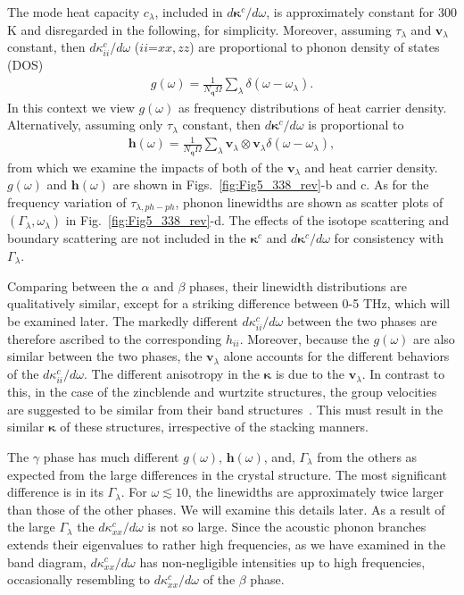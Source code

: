 \documentclass[twocolumn,amsmath,amssymb,a4paper,prb,superscriptaddress,floatfix]{revtex4-1}
\begin{document}
The mode heat capacity $c_\lambda$, included in
$d\boldsymbol{\kappa}^c/d\omega$, is approximately constant for 300 K and
disregarded in the following, for simplicity. Moreover, assuming $\tau_\lambda$
and $\mathbf{v}_\lambda$ constant, then $d\kappa_{ii}^c/d\omega$ ($ii$=$xx,zz$)
are proportional
to phonon density of states (DOS)  
\begin{align}
 \label{eq:dos}
 g(\omega) = \frac{1}{N_\mathbf{q}\Omega}
 \sum_\lambda
 \delta(\omega-\omega_{\lambda}).
\end{align}
In this context we view $g(\omega)$ as frequency distributions of heat
carrier density.  Alternatively, assuming only $\tau_\lambda$ constant,
then $d\boldsymbol{\kappa}^c/d\omega$ is proportional to
\begin{align}
 \label{eq:wdos}
 \boldsymbol{h}(\omega) = \frac{1}{N_\mathbf{q}\Omega}
 \sum_\lambda
 \mathbf{v}_\lambda \otimes \mathbf{v}_\lambda
 \delta(\omega-\omega_{\lambda}),
\end{align}
from which we examine the impacts of both of the $\mathbf{v}_\lambda$ and heat carrier
density.  $g(\omega)$ and  $\boldsymbol{h}(\omega)$
are shown in
Figs.~\ref{fig:Fig5_338_rev}-b and c.  As for the frequency
variation of $\tau_{\lambda,ph-ph}$, phonon linewidths are shown as scatter
plots of $(\Gamma_\lambda,\omega_\lambda)$ in Fig.~\ref{fig:Fig5_338_rev}-d.
The effects of the isotope scattering and boundary scattering are not included
in the $\boldsymbol{\kappa}^c$ and $d\boldsymbol{\kappa}^c/d\omega$ for
consistency with $\Gamma_\lambda$.

Comparing between the $\alpha$ and $\beta$ phases,  their linewidth
distributions are qualitatively similar, except for a striking difference
between 0-5 THz, which will be examined later. The markedly different
$d\kappa_{ii}^c/d\omega$ between the two phases are therefore ascribed to the
corresponding $h_{ii}$. Moreover, because the $g(\omega)$ are also similar
between the two phases, the $\mathbf{v}_\lambda$ alone accounts for the
different behaviors of the $d\kappa_{ii}^c/d\omega$. The different anisotropy in
the $\boldsymbol{\kappa}$ is due to the $\mathbf{v}_\lambda$. In contrast to
this, in the case of the zincblende and wurtzite structures, the group
velocities are suggested to be similar from their band
structures~\cite{phono3py}. This must result in the similar
$\boldsymbol{\kappa}$ of these structures, irrespective of the stacking manners. 

The $\gamma$ phase has much different  $g(\omega)$, $\boldsymbol{h}(\omega)$,
and, $\Gamma_\lambda$ from the others as expected from the large differences in
the crystal structure. The most significant difference is in its
$\Gamma_\lambda$. For $\omega \lesssim 10$, the linewidths are approximately
twice larger than those of the other phases. We will examine this details later.
As a result of the large $\Gamma_\lambda$ the $d\kappa_{xx}^c/d\omega$ is not so
large. Since the acoustic phonon branches extends their eigenvalues to rather
high frequencies, as we have examined in the band diagram,
$d\kappa_{xx}^c/d\omega$ has non-negligible intensities up to high frequencies,
occasionally resembling to $d\kappa_{xx}^c/d\omega$ of the $\beta$ phase.
\end{document}
